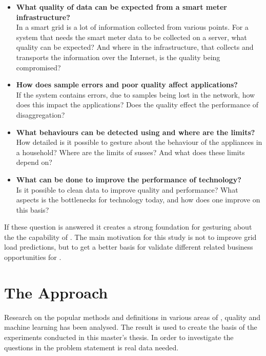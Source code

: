 \begin{itemize}
\item	\textbf{What quality of data can be expected from a smart meter infrastructure?}\\
In a smart grid is a lot of information collected from various points. For a system that needs the smart meter data to be collected on a server, what quality can be expected? And where in the infrastructure, that collects and transports the information over the Internet, is the quality being compromised? \\
	
	
\item	\textbf{How does sample errors and poor quality affect  applications?}\\
If the system contains errors, due to samples being lost in the network, how does this impact the  applications?  Does the quality effect the performance of  disaggregation? \\
	
\item	\textbf{What behaviours can be detected using  and where are the limits?} \\
How detailed is it possible to gesture about the behaviour of the appliances in a household? Where are the limits of susses? And what does these limits depend on?  \\
	
\item	\textbf{What can be done to improve the performance of  technology?}\\
Is it possible to clean data to improve quality and performance? What aspects is the bottlenecks for  technology today, and how does one improve on this basis? \\

\end{itemize}
If these question is answered it creates a strong foundation for gesturing about the the capability of . The main motivation for this study is not to improve grid load predictions, but to get a better basis for validate different  related business opportunities for .

\section{The Approach}
Research on the popular methods and definitions in various areas of , quality and machine learning has been analysed. The result is used to create the basis of the experiments conducted in this master's thesis. In order to investigate the questions in the problem statement is real data needed.

